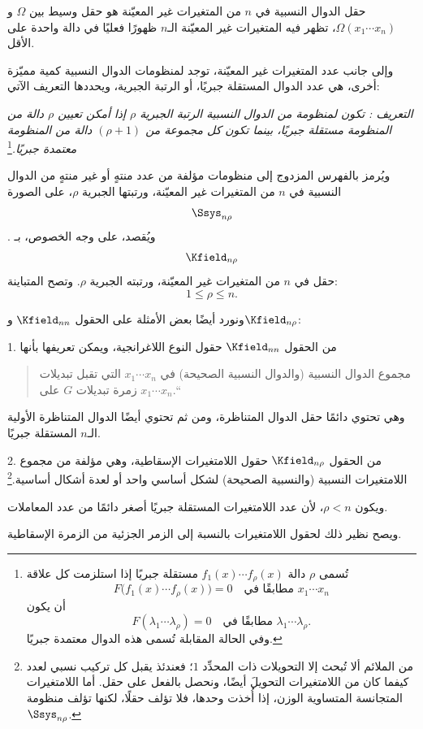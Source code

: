\documentclass[11pt]{article}
\providecommand{\glqq}{\textquotedblbase}
\providecommand{\grqq}{\textquotedblleft}
\newcommand{\srcLTR}[1]{\relax\ifmmode\text{\mbox{\babelsublr{\foreignlanguage{english}{#1}}}}\else\babelsublr{\foreignlanguage{english}{#1}}\fi}
\newcommand{\srcfn}[2]{\begingroup\renewcommand{\thefootnote}{\srcLTR{#1}}\footnote{#2}\addtocounter{footnote}{-1}\endgroup}
\begin{document}
حقل الدوال النسبية في $n$ من المتغيرات غير المعيّنة هو حقل وسيط بين $\Omega$ و$\Omega(x_1\cdots x_n)$، تظهر فيه المتغيرات غير المعيّنة الـ$n$ ظهورًا فعليًا في دالة واحدة على الأقل.

وإلى جانب عدد المتغيرات غير المعيّنة، توجد لمنظومات الدوال النسبية كمية مميّزة أخرى، هي عدد الدوال المستقلة جبريًا، أو الرتبة الجبرية، ويحددها التعريف الآتي:

\emph{التعريف \srcLTR{II}: تكون لمنظومة من الدوال النسبية الرتبة الجبرية $\rho$ إذا أمكن تعيين $\rho$ دالة من المنظومة مستقلة جبريًا، بينما تكون كل مجموعة من $(\rho+1)$ دالة من المنظومة معتمدة جبريًا.}\srcfn{***)}{تُسمى $\rho$ دالة $f_1(x)\cdots f_\rho(x)$ مستقلة جبريًا إذا استلزمت كل علاقة
\[
F\bigl(f_1(x)\cdots f_\rho(x)\bigr)=0\quad\text{مطابقًا في }x_1\cdots x_n
\]
أن يكون
\[
F(\lambda_1\cdots \lambda_\rho)=0\quad\text{مطابقًا في }\lambda_1\cdots \lambda_\rho.
\]
وفي الحالة المقابلة تُسمى هذه الدوال معتمدة جبريًا.}

ويُرمز بالفهرس المزدوج إلى منظومات مؤلفة من عدد منتهٍ أو غير منتهٍ من الدوال النسبية في $n$ من المتغيرات غير المعيّنة، ورتبتها الجبرية $\rho$، على الصورة
\[
  \Ssys_{n\rho}
\]
. ويُقصد، على وجه الخصوص، بـ
\[
  \Kfield_{n\rho}
\]
حقل في $n$ من المتغيرات غير المعيّنة، ورتبته الجبرية $\rho$. وتصح المتباينة:
\[
  1\leq \rho\leq n.
\]

ونورد أيضًا بعض الأمثلة على الحقول $\Kfield_{nn}$ و$\Kfield_{n\rho}$:

1. من الحقول $\Kfield_{nn}$ حقول النوع اللاغرانجية، ويمكن تعريفها بأنها
\begin{quote}
\glqq{}مجموع الدوال النسبية (والدوال النسبية الصحيحة) في $x_1\cdots x_n$ التي تقبل تبديلات زمرة تبديلات $G$ على $x_1\cdots x_n$.\grqq{}
\end{quote}
وهي تحتوي دائمًا حقل الدوال المتناظرة، ومن ثم تحتوي أيضًا الدوال المتناظرة الأولية الـ$n$ المستقلة جبريًا.

2. من الحقول $\Kfield_{n\rho}$ حقول اللامتغيرات الإسقاطية، وهي مؤلفة من مجموع اللامتغيرات النسبية (والنسبية الصحيحة) لشكل أساسي واحد أو لعدة أشكال أساسية.\srcfn{*)}{من الملائم ألا تُبحث إلا التحويلات ذات المحدِّد $1$؛ فعندئذ يقبل كل تركيب نسبي لعدد كيفما كان من اللامتغيرات التحويلَ أيضًا، ونحصل بالفعل على حقل. أما اللامتغيرات المتجانسة المتساوية الوزن، إذا أُخذت وحدها، فلا تؤلف حقلًا، لكنها تؤلف منظومة $\Ssys_{n\rho}$.} ويكون $\rho<n$، لأن عدد اللامتغيرات المستقلة جبريًا أصغر دائمًا من عدد المعاملات.

ويصح نظير ذلك لحقول اللامتغيرات بالنسبة إلى الزمر الجزئية من الزمرة الإسقاطية.
\end{document}
